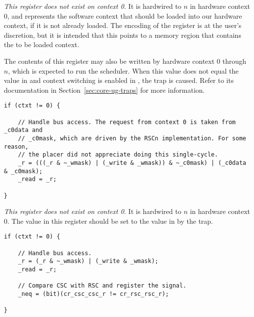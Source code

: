 
\emph{This register does not exist on context 0.} It is hardwired to
$n$ in hardware context 0, and represents the software context that
should be loaded into our hardware context, if it is not already loaded. The
encoding of the register is at the user's discretion, but it is intended that
this points to a memory region that contains the to be loaded context.

The contents of this register may also be written by hardware context 0 through
$n$, which is expected to run the scheduler. When this value does not
equal the value in   and context switching is enabled in ,
the  trap is caused. Refer to its documentation in
Section~\ref{sec:core-ug-traps} for more information.

\declaration{}
\implementation{}
\begin{lstlisting}
if (ctxt != 0) {
    
    // Handle bus access. The request from context 0 is taken from _c0data and
    // _c0mask, which are driven by the RSCn implementation. For some reason,
    // the placer did not appreciate doing this single-cycle.
    _r = (((_r & ~_wmask) | (_write & _wmask)) & ~_c0mask) | (_c0data & _c0mask);
    _read = _r;
    
}
\end{lstlisting}


\emph{This register does not exist on context 0.} It is hardwired to
$n$ in hardware context 0. The value in this register should be set
to the value in  by the  trap.

\declaration{}
\implementation{}
\begin{lstlisting}
if (ctxt != 0) {
    
    // Handle bus access.
    _r = (_r & ~_wmask) | (_write & _wmask);
    _read = _r;
    
    // Compare CSC with RSC and register the signal.
    _neq = (bit)(cr_csc_csc_r != cr_rsc_rsc_r);
    
}
\end{lstlisting} %

